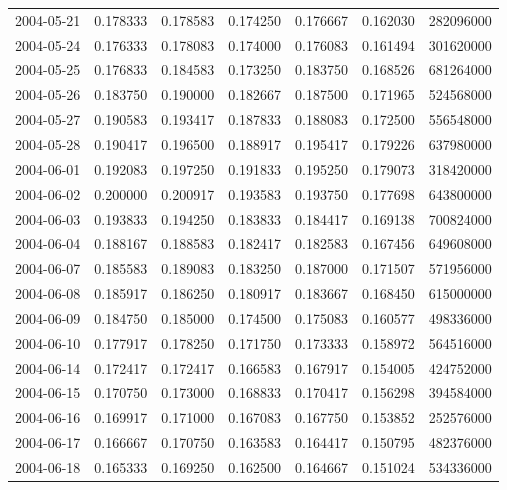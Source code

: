 \begin{tabular}{lrrrrrr}
2004-05-21 &    0.178333 &    0.178583 &    0.174250 &    0.176667 &    0.162030 &   282096000 \\
2004-05-24 &    0.176333 &    0.178083 &    0.174000 &    0.176083 &    0.161494 &   301620000 \\
2004-05-25 &    0.176833 &    0.184583 &    0.173250 &    0.183750 &    0.168526 &   681264000 \\
2004-05-26 &    0.183750 &    0.190000 &    0.182667 &    0.187500 &    0.171965 &   524568000 \\
2004-05-27 &    0.190583 &    0.193417 &    0.187833 &    0.188083 &    0.172500 &   556548000 \\
2004-05-28 &    0.190417 &    0.196500 &    0.188917 &    0.195417 &    0.179226 &   637980000 \\
2004-06-01 &    0.192083 &    0.197250 &    0.191833 &    0.195250 &    0.179073 &   318420000 \\
2004-06-02 &    0.200000 &    0.200917 &    0.193583 &    0.193750 &    0.177698 &   643800000 \\
2004-06-03 &    0.193833 &    0.194250 &    0.183833 &    0.184417 &    0.169138 &   700824000 \\
2004-06-04 &    0.188167 &    0.188583 &    0.182417 &    0.182583 &    0.167456 &   649608000 \\
2004-06-07 &    0.185583 &    0.189083 &    0.183250 &    0.187000 &    0.171507 &   571956000 \\
2004-06-08 &    0.185917 &    0.186250 &    0.180917 &    0.183667 &    0.168450 &   615000000 \\
2004-06-09 &    0.184750 &    0.185000 &    0.174500 &    0.175083 &    0.160577 &   498336000 \\
2004-06-10 &    0.177917 &    0.178250 &    0.171750 &    0.173333 &    0.158972 &   564516000 \\
2004-06-14 &    0.172417 &    0.172417 &    0.166583 &    0.167917 &    0.154005 &   424752000 \\
2004-06-15 &    0.170750 &    0.173000 &    0.168833 &    0.170417 &    0.156298 &   394584000 \\
2004-06-16 &    0.169917 &    0.171000 &    0.167083 &    0.167750 &    0.153852 &   252576000 \\
2004-06-17 &    0.166667 &    0.170750 &    0.163583 &    0.164417 &    0.150795 &   482376000 \\
2004-06-18 &    0.165333 &    0.169250 &    0.162500 &    0.164667 &    0.151024 &   534336000 \\

\end{tabular}
